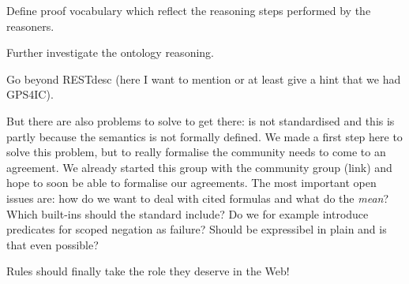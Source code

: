 
% 

% 

% 

Define proof vocabulary which reflect the reasoning steps performed by the reasoners.

Further investigate the ontology reasoning.

Go beyond RESTdesc (here I want to mention or at least give a hint that we had GPS4IC).



But there are also problems to solve to get there: \nthree is not standardised and this is partly because the semantics is not formally defined. We made a first step here to 
solve this problem, but to really formalise \nthree the community needs to come to an agreement. We already started this group with the \wwwc community group (link)
and hope to soon be able to formalise our agreements. The most important open issues are: how do we want to deal with cited formulas and what do the \emph{mean}?
Which built-ins should the standard include? Do we for example introduce predicates for scoped negation as failure? Should \nthree be expressibel in plain \rdf and 
is that even possible?



Rules should finally take the role they deserve in the Web!


